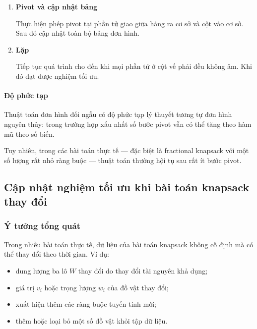 \documentclass[fontsize=13pt,a4paper]{report}
\begin{document}
\begin{enumerate}
    Chọn cột cho giá trị nhỏ nhất của \(\theta_j\) làm biến vào cơ sở nhằm duy trì tính khả thi đối ngẫu sau pivot.

    Nếu không tồn tại phần tử âm nào trên hàng \(r\), bài toán vô nghiệm.

    \item \textbf{Pivot và cập nhật bảng}

    Thực hiện phép pivot tại phần tử giao giữa hàng ra cơ sở và cột vào cơ sở. Sau đó cập nhật toàn bộ bảng đơn hình.

    \item \textbf{Lặp}

    Tiếp tục quá trình cho đến khi mọi phần tử ở cột vế phải đều không âm. Khi đó đạt được nghiệm tối ưu.

\end{enumerate}

\paragraph{Độ phức tạp}

Thuật toán đơn hình đối ngẫu có độ phức tạp lý thuyết tương tự đơn hình nguyên thủy: trong trường hợp xấu nhất số bước pivot vẫn có thể tăng theo hàm mũ theo số biến.

Tuy nhiên, trong các bài toán thực tế --- đặc biệt là fractional knapsack với một số lượng rất nhỏ ràng buộc --- thuật toán thường hội tụ sau rất ít bước pivot. 

\subsection{Cập nhật nghiệm tối ưu khi bài toán knapsack thay đổi}

\subsubsection{Ý tưởng tổng quát}

Trong nhiều bài toán thực tế, dữ liệu của bài toán knapsack không cố định mà có thể thay đổi theo thời gian. Ví dụ:

\begin{itemize}
    \item dung lượng ba lô \(W\) thay đổi do thay đổi tài nguyên khả dụng;
    \item giá trị \(v_i\) hoặc trọng lượng \(w_i\) của đồ vật thay đổi;
    \item xuất hiện thêm các ràng buộc tuyến tính mới;
    \item thêm hoặc loại bỏ một số đồ vật khỏi tập dữ liệu.
\end{itemize}
\end{document}
